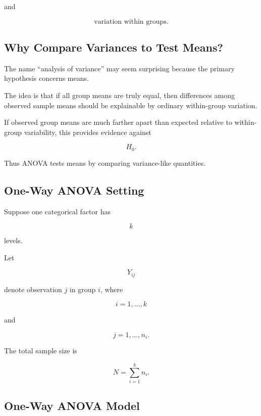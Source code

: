 and

\[
\boxed{
\text{variation within groups}.
}
\]

\subsection{Why Compare Variances to Test Means?}
\label{subsec:why-anova-compares-variance}

The name ``analysis of variance'' may seem surprising because the primary
hypothesis concerns means.

The idea is that if all group means are truly equal, then differences
among observed sample means should be explainable by ordinary
within-group variation.

If observed group means are much farther apart than expected relative to
within-group variability, this provides evidence against

\[
H_0.
\]

Thus ANOVA tests means by comparing variance-like quantities.

\subsection{One-Way ANOVA Setting}
\label{subsec:one-way-anova-setting}

Suppose one categorical factor has

\[
k
\]

levels.

Let

\[
Y_{ij}
\]

denote observation \(j\) in group \(i\), where

\[
i=1,\ldots,k
\]

and

\[
j=1,\ldots,n_i.
\]

The total sample size is

\[
\boxed{
N
=
\sum_{i=1}^{k}n_i.
}
\]

\subsection{One-Way ANOVA Model}
\label{subsec:one-way-anova-model}

